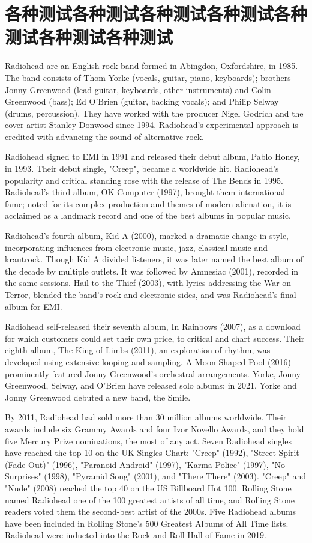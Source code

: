 \chapter{各种测试各种测试各种测试各种测试各种测试各种测试各种测试}

{\setlength{\parindent}{0em}
Radiohead are an English rock band formed in Abingdon, Oxfordshire, in 1985. The band consists of Thom Yorke (vocals, guitar, piano, keyboards); brothers Jonny Greenwood (lead guitar, keyboards, other instruments) and Colin Greenwood (bass); Ed O'Brien (guitar, backing vocals); and Philip Selway (drums, percussion). They have worked with the producer Nigel Godrich and the cover artist Stanley Donwood since 1994. Radiohead's experimental approach is credited with advancing the sound of alternative rock.

Radiohead signed to EMI in 1991 and released their debut album, Pablo Honey, in 1993. Their debut single, "Creep", became a worldwide hit. Radiohead's popularity and critical standing rose with the release of The Bends in 1995. Radiohead's third album, OK Computer (1997), brought them international fame; noted for its complex production and themes of modern alienation, it is acclaimed as a landmark record and one of the best albums in popular music.

Radiohead's fourth album, Kid A (2000), marked a dramatic change in style, incorporating influences from electronic music, jazz, classical music and krautrock. Though Kid A divided listeners, it was later named the best album of the decade by multiple outlets. It was followed by Amnesiac (2001), recorded in the same sessions. Hail to the Thief (2003), with lyrics addressing the War on Terror, blended the band's rock and electronic sides, and was Radiohead's final album for EMI.

Radiohead self-released their seventh album, In Rainbows (2007), as a download for which customers could set their own price, to critical and chart success. Their eighth album, The King of Limbs (2011), an exploration of rhythm, was developed using extensive looping and sampling. A Moon Shaped Pool (2016) prominently featured Jonny Greenwood's orchestral arrangements. Yorke, Jonny Greenwood, Selway, and O'Brien have released solo albums; in 2021, Yorke and Jonny Greenwood debuted a new band, the Smile.

By 2011, Radiohead had sold more than 30 million albums worldwide. Their awards include six Grammy Awards and four Ivor Novello Awards, and they hold five Mercury Prize nominations, the most of any act. Seven Radiohead singles have reached the top 10 on the UK Singles Chart: "Creep" (1992), "Street Spirit (Fade Out)" (1996), "Paranoid Android" (1997), "Karma Police" (1997), "No Surprises" (1998), "Pyramid Song" (2001), and "There There" (2003). "Creep" and "Nude" (2008) reached the top 40 on the US Billboard Hot 100. Rolling Stone named Radiohead one of the 100 greatest artists of all time, and Rolling Stone readers voted them the second-best artist of the 2000s. Five Radiohead albums have been included in Rolling Stone's 500 Greatest Albums of All Time lists. Radiohead were inducted into the Rock and Roll Hall of Fame in 2019.
}

